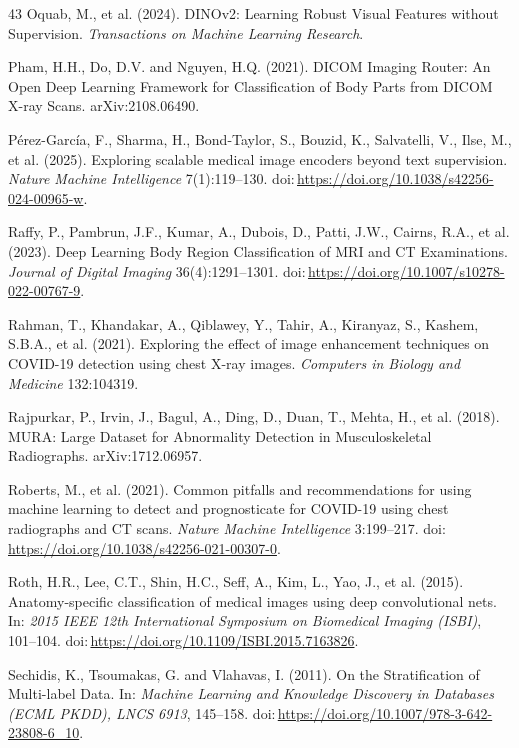 \begin{thebibliography}{43}
Oquab, M., et al. (2024). DINOv2: Learning Robust Visual Features without Supervision. \textit{Transactions on Machine Learning Research}.

Pham, H.H., Do, D.V. and Nguyen, H.Q. (2021). DICOM Imaging Router: An Open Deep Learning Framework for Classification of Body Parts from DICOM X-ray Scans. arXiv:2108.06490.

P{\'e}rez-García, F., Sharma, H., Bond-Taylor, S., Bouzid, K., Salvatelli, V., Ilse, M., et al. (2025). Exploring scalable medical image encoders beyond text supervision. \textit{Nature Machine Intelligence} 7(1):119--130. doi:\,\url{https://doi.org/10.1038/s42256-024-00965-w}.

Raffy, P., Pambrun, J.F., Kumar, A., Dubois, D., Patti, J.W., Cairns, R.A., et al. (2023). Deep Learning Body Region Classification of MRI and CT Examinations. \textit{Journal of Digital Imaging} 36(4):1291--1301. doi:\,\url{https://doi.org/10.1007/s10278-022-00767-9}.

Rahman, T., Khandakar, A., Qiblawey, Y., Tahir, A., Kiranyaz, S., Kashem, S.B.A., et al. (2021). Exploring the effect of image enhancement techniques on COVID-19 detection using chest X-ray images. \textit{Computers in Biology and Medicine} 132:104319.

Rajpurkar, P., Irvin, J., Bagul, A., Ding, D., Duan, T., Mehta, H., et al. (2018). MURA: Large Dataset for Abnormality Detection in Musculoskeletal Radiographs. arXiv:1712.06957.

Roberts, M., et al. (2021). Common pitfalls and recommendations for using machine learning to detect and prognosticate for COVID-19 using chest radiographs and CT scans. \textit{Nature Machine Intelligence} 3:199--217. doi:\,\url{https://doi.org/10.1038/s42256-021-00307-0}.

Roth, H.R., Lee, C.T., Shin, H.C., Seff, A., Kim, L., Yao, J., et al. (2015). Anatomy-specific classification of medical images using deep convolutional nets. In: \textit{2015 IEEE 12th International Symposium on Biomedical Imaging (ISBI)}, 101--104. doi:\,\url{https://doi.org/10.1109/ISBI.2015.7163826}.

Sechidis, K., Tsoumakas, G. and Vlahavas, I. (2011). On the Stratification of Multi-label Data. In: \textit{Machine Learning and Knowledge Discovery in Databases (ECML PKDD), LNCS 6913}, 145--158. doi:\,\url{https://doi.org/10.1007/978-3-642-23808-6_10}.


\end{thebibliography}
